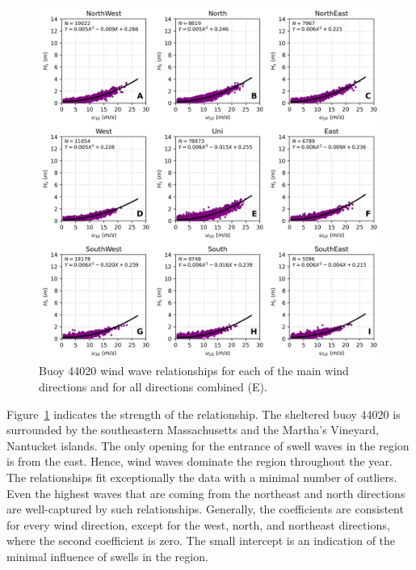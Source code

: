 \begin{figure}[H]
\centering
\includegraphics[width=0.95\linewidth]{Figures/Chapter5/b44020_wind_wave.png}
\caption{Buoy 44020 wind wave relationships for each of the main wind directions and for all directions combined (E).}
\label{fig:wind_wave_44020}
\end{figure}


Figure~\ref{fig:wind_wave_44020} indicates the strength of the relationship. The sheltered buoy 44020 is surrounded by the southeastern Massachusetts and the Martha’s Vineyard, Nantucket islands. The only opening for the entrance of swell waves in the region is from the east. Hence, wind waves dominate the region throughout the year. The relationships fit exceptionally the data with a minimal number of outliers. Even the highest waves that are coming from the northeast and north directions are well-captured by such relationships. Generally, the coefficients are consistent for every wind direction, except for the west, north, and northeast directions, where the second coefficient is zero. The small intercept is an indication of the minimal influence of swells in the region.


